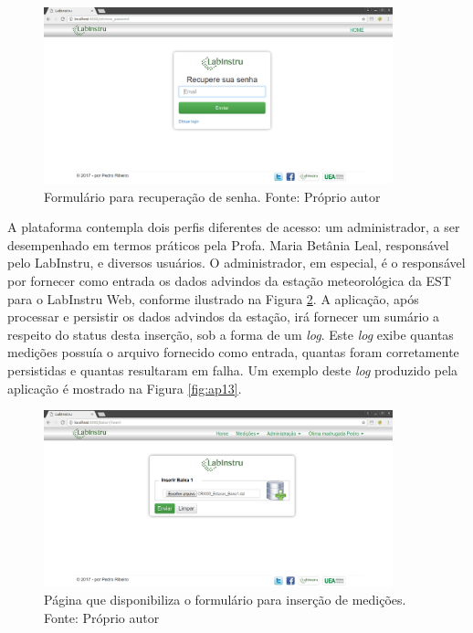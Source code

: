 \begin{figure}[h!]
	\centering
	\includegraphics[width=0.9\textwidth]{./img/ap11.png}
	\caption{Formulário para recuperação de senha. Fonte: Próprio autor} \label{fig:ap11}
\end{figure}

A plataforma contempla dois perfis diferentes de acesso: um administrador, a ser desempenhado em termos práticos pela Profa. Maria Betânia Leal, responsável pelo LabInstru, e diversos usuários. O administrador, em especial, é o responsável por fornecer como entrada os dados advindos da estação meteorológica da EST para o LabInstru Web, conforme ilustrado na Figura \ref{fig:ap12}. A aplicação, após processar e persistir os dados advindos da estação, irá fornecer um sumário a respeito do status desta inserção, sob a forma de um \emph{log}. Este \emph{log} exibe quantas medições possuía o arquivo fornecido como entrada, quantas foram corretamente persistidas e quantas resultaram em falha. Um exemplo deste \emph{log} produzido pela aplicação é mostrado na Figura \ref{fig:ap13}.

\begin{figure}[h!]
	\centering
	\includegraphics[width=0.9\textwidth]{./img/ap12.png}
	\caption{Página que disponibiliza o formulário para inserção de medições. Fonte: Próprio autor} \label{fig:ap12}
\end{figure}

